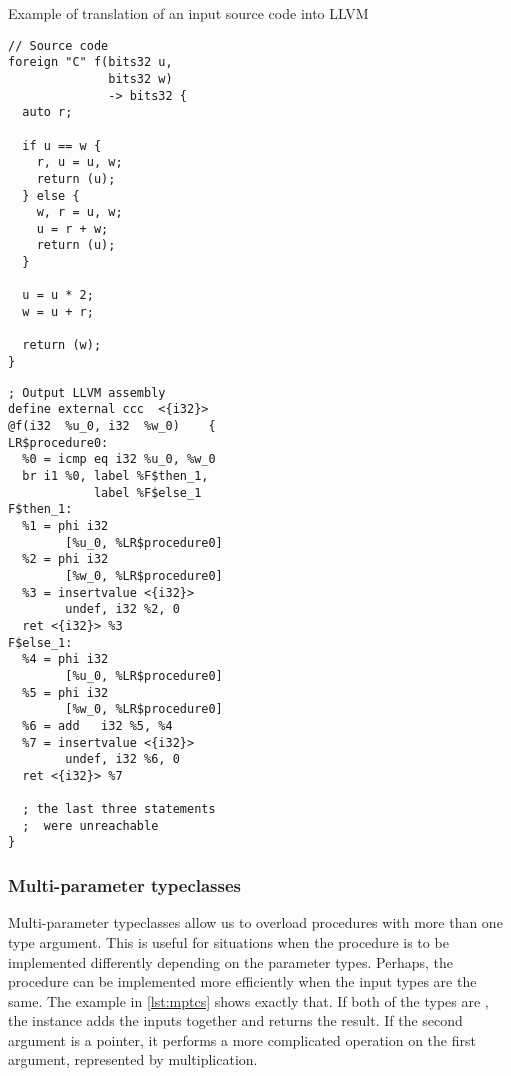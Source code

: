 \begin{codex}
    \small
    \caption{Example of translation of an input source code into LLVM}
    \label{lst:translex}
    \begin{center}
    \begin{minipage}{0.5\linewidth}
    \begin{lstlisting}
// Source code
foreign "C" f(bits32 u,
              bits32 w)
              -> bits32 {
  auto r;

  if u == w {
    r, u = u, w;
    return (u);
  } else {
    w, r = u, w;
    u = r + w;
    return (u);
  }

  u = u * 2;
  w = u + r;

  return (w);
}
    \end{lstlisting}
    \end{minipage}%
    \begin{minipage}{0.5\linewidth}
    \begin{lstlisting}[style=llvmStyle]
; Output LLVM assembly
define external ccc  <{i32}>
@f(i32  %u_0, i32  %w_0)    {
LR$procedure0:
  %0 = icmp eq i32 %u_0, %w_0
  br i1 %0, label %F$then_1,
            label %F$else_1
F$then_1:
  %1 = phi i32
        [%u_0, %LR$procedure0]
  %2 = phi i32
        [%w_0, %LR$procedure0]
  %3 = insertvalue <{i32}>
        undef, i32 %2, 0
  ret <{i32}> %3
F$else_1:
  %4 = phi i32
        [%u_0, %LR$procedure0]
  %5 = phi i32
        [%w_0, %LR$procedure0]
  %6 = add   i32 %5, %4
  %7 = insertvalue <{i32}>
        undef, i32 %6, 0
  ret <{i32}> %7

  ; the last three statements
  ;  were unreachable
}
    \end{lstlisting}
    \end{minipage}
    \end{center}
\end{codex}

\subsubsection{Multi-parameter typeclasses}
\label{sec:mptcs}

Multi-parameter typeclasses allow us to overload procedures with more than one type argument. This is useful for situations when the procedure is to be implemented differently depending on the parameter types. Perhaps, the procedure can be implemented more efficiently when the input types are the same. The example in \cref{lst:mptcs} shows exactly that. If both of the types are , the instance adds the inputs together and returns the result. If the second argument is a pointer, it performs a more complicated operation on the first argument, represented by multiplication.

